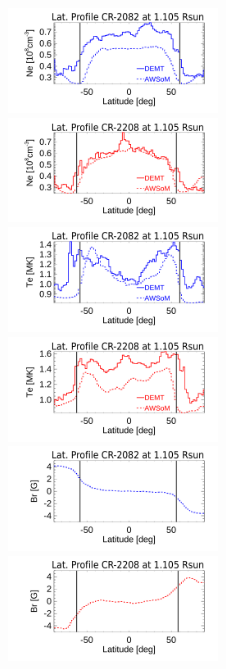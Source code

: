 \documentclass[namedreferences]{solarphysics}
\begin{document}
\begin{article}
\begin{figure}[h!]
\begin{center}
\includegraphics[width=0.495\textwidth]{figs/Perfil_Ne_demt_awsom_2082_1105_2.pdf}
\includegraphics[width=0.495\textwidth]{figs/Perfil_Ne_demt_awsom_2208_multistart2_1105.pdf}
\includegraphics[width=0.495\textwidth]{figs/Perfil_Te_demt_awsom_2082_1105_2.pdf}
\includegraphics[width=0.495\textwidth]{figs/Perfil_Te_demt_awsom_2208_multistart2_1105.pdf}
\includegraphics[width=0.495\textwidth]{figs/Perfil_Br_2082_1105_2.pdf}
\includegraphics[width=0.495\textwidth]{figs/Perfil_Br_2208_1105_2.pdf}

\end{center}
\end{figure}
\end{article}
\end{document}
